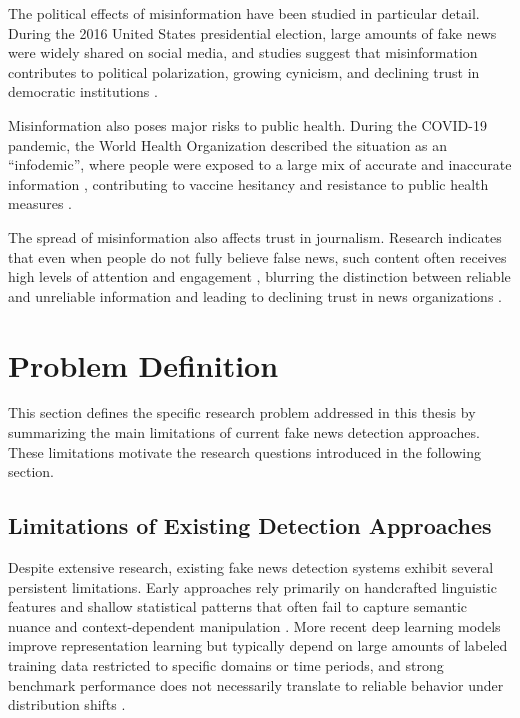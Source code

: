 The political effects of misinformation have been studied in particular detail. During the 2016 United States presidential election, large amounts of fake news were widely shared on social media, and studies suggest that misinformation contributes to political polarization, growing cynicism, and declining trust in democratic institutions \cite{iizuka-2022, colomina-2021}.

Misinformation also poses major risks to public health. During the COVID-19 pandemic, the World Health Organization described the situation as an ``infodemic'', where people were exposed to a large mix of accurate and inaccurate information \cite{ijerph17072430}, contributing to vaccine hesitancy and resistance to public health measures \cite{adams-2023}.

The spread of misinformation also affects trust in journalism. Research indicates that even when people do not fully believe false news, such content often receives high levels of attention and engagement \cite{adams-2023}, blurring the distinction between reliable and unreliable information and leading to declining trust in news organizations \cite{Lazer_2018}.

\section{Problem Definition}

This section defines the specific research problem addressed in this thesis by summarizing the main limitations of current fake news detection approaches. These limitations motivate the research questions introduced in the following section.

\subsection{Limitations of Existing Detection Approaches}

Despite extensive research, existing fake news detection systems exhibit several persistent limitations. Early approaches rely primarily on handcrafted linguistic features and shallow statistical patterns that often fail to capture semantic nuance and context-dependent manipulation \cite{tong-etal-2025-generate}. More recent deep learning models improve representation learning but typically depend on large amounts of labeled training data restricted to specific domains or time periods, and strong benchmark performance does not necessarily translate to reliable behavior under distribution shifts \cite{HAMED2023e20382}.

